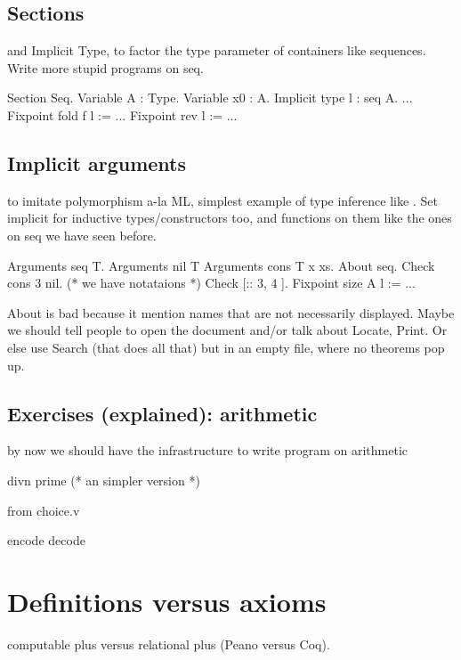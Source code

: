 \subsection{Sections}
and Implicit Type, to factor the type parameter of containers like
sequences.  Write more stupid programs on seq.

\begin{coq}{}
Section Seq.
Variable A : Type.
Variable x0 : A.
Implicit type l : seq A.
...
Fixpoint fold f l := ...
Fixpoint rev l := ...
\end{coq}


\subsection{Implicit arguments}
to imitate polymorphism a-la ML, simplest example of type inference
like .  Set implicit for inductive types/constructors too,
and functions on them like the ones on seq we have seen before.

\begin{coq}{}
Arguments seq {T}.
Arguments nil {T}
Arguments cons {T} x xs.
About seq.
Check cons 3 nil.
(* we have notataions *)
Check [:: 3, 4 ].
Fixpoint size A l := ...
\end{coq}

About is bad because it mention names that are not necessarily displayed.
Maybe we should tell people to open the document and/or talk about Locate,
Print.  Or else use Search (that does all that) but in an empty
file, where no theorems pop up.

\subsection{Exercises (explained): arithmetic}
by now we should have the infrastructure to write program on arithmetic

\begin{coq}{}
divn
prime  (* an simpler version *)
\end{coq}

from choice.v

\begin{coq}{}
encode
decode
\end{coq}

\section{Definitions versus axioms}

computable plus versus relational plus (Peano versus Coq).

